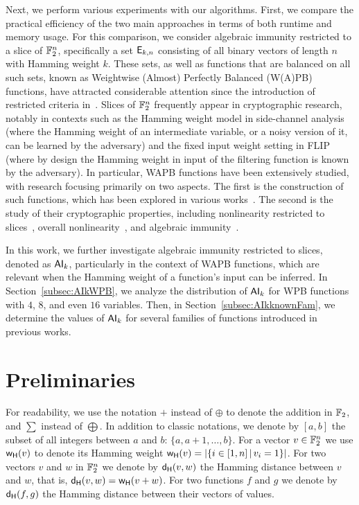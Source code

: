 \documentclass[11pt]{llncs}
\begin{document}
Next, we perform various experiments with our algorithms. 
First, we compare the practical efficiency of the two main approaches in terms of both runtime and memory usage. 
For this comparison, we consider algebraic immunity restricted to a slice of $\mathbb{F}_2^n$, specifically a set $\mathsf{E}_{k,n}$ consisting of all binary vectors of length $n$ with Hamming weight $k$.  
These sets, as well as functions that are balanced on all such sets, known as Weightwise (Almost) Perfectly Balanced (W(A)PB) functions, have attracted considerable attention since the introduction of restricted criteria in~\cite{TOSC:CarMeaRot17}.  
Slices of $\mathbb{F}_2^n$ frequently appear in cryptographic research, notably in contexts such as the Hamming weight model in side-channel analysis (where the Hamming weight of an intermediate variable, or a noisy version of it, can be learned by the adversary) and the fixed input weight setting in FLIP~\cite{EC:MJSC16} (where by design the Hamming weight in input of the filtering function is known by the adversary). 
In particular, WAPB functions have been extensively studied, with research focusing primarily on two aspects. The first is the construction of such functions, which has been explored in various works~\cite{TOSC:CarMeaRot17,CC:TangLiu19,DCC:LiuMes19,DAM:LiSu20,CC:MesSu21,DAM:ZhuSu22,CEC:MPJDL22,ACI:ManKuLar22,INDO:GinMea22,CC:MSLZ22,DAM:GuoSu22,DAM:ZLCQZ23,AMC:ZhangSu23,Mat:ZJZQ23,ASIACCS:YCL+23,CCDS:GinMea24,AMC:DalMal23,SAC:Meaux24,eprint:DalMalMea24}. 
The second is the study of their cryptographic properties, including nonlinearity restricted to slices~\cite{DAM:GinMea22}, overall nonlinearity~\cite{C2SI:GinMea23}, and algebraic immunity~\cite{Latin:GinMea23}.  

In this work, we further investigate algebraic immunity restricted to slices, denoted as $\mathsf{AI}_k$, particularly in the context of WAPB functions, which are relevant when the Hamming weight of a function’s input can be inferred. 
In Section~\ref{subsec:AIkWPB}, we analyze the distribution of $\mathsf{AI}_k$ for WPB functions with $4$, $8$, and even $16$ variables. 
Then, in Section~\ref{subsec:AIkknownFam}, we determine the values of $\mathsf{AI}_{k}$ for several families of functions introduced in previous works.  


\section{Preliminaries}\label{sec:prelim}


For readability, we use the notation $+$ instead of 
$\oplus$ to denote the addition in $\mathbb{F}_2$, and $\sum$ instead of $\bigoplus$. 
In addition to classic notations, we denote by $ [a,b] $ the subset of all integers between $a$ and $b$: $\{a, a+1, \ldots,b\}$. 
For a vector $v\in \mathbb{F}_2^n$ we use $\mathsf{w_H}(v)$ to denote its Hamming weight $\mathsf{w_H}(v)=|\{ i \in [1,n] \, | \, v_i=1 \}|$. 
For two vectors $v$ and $w$ in $\mathbb{F}_2^n$ we denote by $\mathsf{d_H}(v,w)$ the Hamming distance between $v$ and $w$, that is, $\mathsf{d_H}(v,w)=\mathsf{w_H}(v+w)$. 
For two functions $f$ and $g$ we denote by $\mathsf{d_H}(f,g)$ the Hamming distance between their vectors of values.
\end{document}
